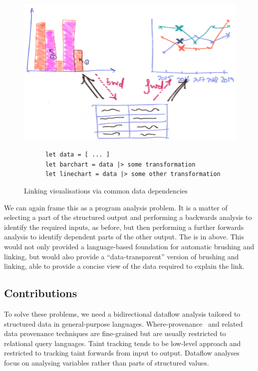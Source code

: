 \begin{figure}[H]
   {\includegraphics[scale=0.14]{fig/example/vis-linking.png}}
   \small
   \begin{lstlisting}
      let data = [ ... ]
      let barchart = data |> some transformation
      let linechart = data |> some other transformation
   \end{lstlisting}
   \caption{Linking visualisations via common data dependencies}
   \label{fig:introduction:vis-linking}
\end{figure}

We can again frame this as a program analysis problem. It is a matter of selecting a part of the structured output and performing a backwards analysis to identify the required inputs, as before, but then performing a further forwards analysis to identify dependent parts of the other output. The is in  above. This would not only provided a language-based foundation for automatic brushing and linking, but would also provide a ``data-transparent'' version of brushing and linking, able to provide a concise view of the data required to explain the link.

\subsection{Contributions}

To solve these problems, we need a bidirectional dataflow analysis tailored to structured data in general-purpose languages. Where-provenance~\cite{buneman01} and related data provenance techniques are fine-grained but are usually restricted to relational query languages. Taint tracking \cite{newsome05} tends to be low-level approach and restricted to tracking taint forwards from input to output. Dataflow analyses \cite{reps95} focus on analysing variables rather than parts of structured values.

